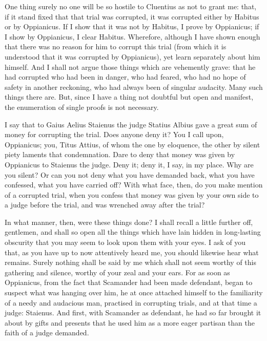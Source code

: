  One thing surely no one will be so hostile to Cluentius as not to grant me: that, if it stand fixed that that trial was corrupted, it was corrupted either by Habitus or by Oppianicus. If I show that it was not by Habitus, I prove by Oppianicus; if I show by Oppianicus, I clear Habitus. Wherefore, although I have shown enough that there was no reason for him to corrupt this trial (from which it is understood that it was corrupted by Oppianicus), yet learn separately about him himself. And I shall not argue those things which are vehemently grave: that he had corrupted who had been in danger, who had feared, who had no hope of safety in another reckoning, who had always been of singular audacity. Many such things there are. But, since I have a thing not doubtful but open and manifest, the enumeration of single proofs is not necessary.

 I say that to Gaius Aelius Staienus the judge Statius Albius gave a great sum of money for corrupting the trial. Does anyone deny it? You I call upon, Oppianicus; you, Titus Attius, of whom the one by eloquence, the other by silent piety laments that condemnation. Dare to deny that money was given by Oppianicus to Staienus the judge. Deny it; deny it, I say, in my place. Why are you silent? Or can you not deny what you have demanded back, what you have confessed, what you have carried off? With what face, then, do you make mention of a corrupted trial, when you confess that money was given by your own side to a judge before the trial, and was wrenched away after the trial?

 In what manner, then, were these things done? I shall recall a little further off, gentlemen, and shall so open all the things which have lain hidden in long-lasting obscurity that you may seem to look upon them with your eyes. I ask of you that, as you have up to now attentively heard me, you should likewise hear what remains. Surely nothing shall be said by me which shall not seem worthy of this gathering and silence, worthy of your zeal and your ears. For as soon as Oppianicus, from the fact that Scamander had been made defendant, began to suspect what was hanging over him, he at once attached himself to the familiarity of a needy and audacious man, practised in corrupting trials, and at that time a judge: Staienus. And first, with Scamander as defendant, he had so far brought it about by gifts and presents that he used him as a more eager partisan than the faith of a judge demanded.

